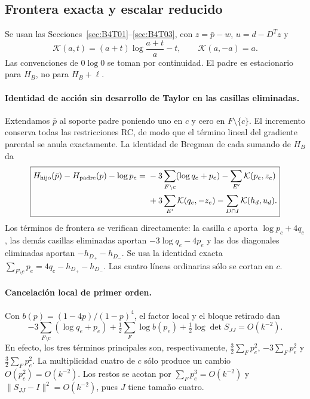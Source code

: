 \subsection{Frontera exacta y escalar reducido}\label{sec:B4T04}
Se usan las Secciones~\ref{sec:B4T01}--\ref{sec:B4T03}, con $z=\bar p-w$, $u=d-D^Tz$ y
\[
 \mathcal K(a,t)=(a+t)\log\frac{a+t}{a}-t,
 \qquad \mathcal K(a,-a)=a.
\]
Las convenciones de $0\log0$ se toman por continuidad.
El padre es estacionario para $H_B$, no para $H_B+\ell$.

\paragraph{Identidad de acción sin desarrollo de Taylor en las casillas eliminadas.}
Extendamos $\bar p$ al soporte padre poniendo uno en $c$ y cero en
$F\setminus\{c\}$. El incremento conserva todas las restricciones RC,
de modo que el término lineal del gradiente parental se anula exactamente.
La identidad de Bregman de cada sumando de $H_B$ da
\[
 \boxed{\begin{aligned}
 H_{\rm hijo}(\bar p)-H_{\rm padre}(p)-\log p_c
 ={}&-3\sum_{F\setminus c}(\log q_e+p_e)
 -\sum_{E'}\mathcal K(p_e,z_e)\\
 &+3\sum_{E'}\mathcal K(q_e,-z_e)
 -\sum_{D\cap I}\mathcal K(h_d,u_d).
 \end{aligned}}
\]
Los términos de frontera se verifican directamente: la casilla $c$ aporta $\log p_c+4q_c$,
las demás casillas eliminadas aportan $-3\log q_e-4p_e$ y las dos
diagonales eliminadas aportan $-h_{D_+}-h_{D_-}$.
Se usa la identidad exacta
$\sum_{F\setminus c}p_e=4q_c-h_{D_+}-h_{D_-}$.
Las cuatro líneas ordinarias sólo se cortan en $c$.

\paragraph{Cancelación local de primer orden.}
Con $b(p)=(1-4p)/(1-p)^4$, el factor local y el bloque retirado dan
\[
 -3\sum_{F\setminus c}(\log q_e+p_e)
 +\tfrac12\sum_F\log b(p_e)+\tfrac12\log\det S_{JJ}=O(k^{-2}).
\]
En efecto, los tres términos principales son, respectivamente,
$\tfrac32\sum_Fp_e^2$, $-3\sum_Fp_e^2$ y $\tfrac32\sum_Fp_e^2$.
La multiplicidad cuatro de $c$ sólo produce un cambio $O(p_c^2)=O(k^{-2})$.
Los restos se acotan por $\sum_Fp_e^3=O(k^{-2})$ y
$\|S_{JJ}-I\|^2=O(k^{-2})$, pues $J$ tiene tamaño cuatro.

